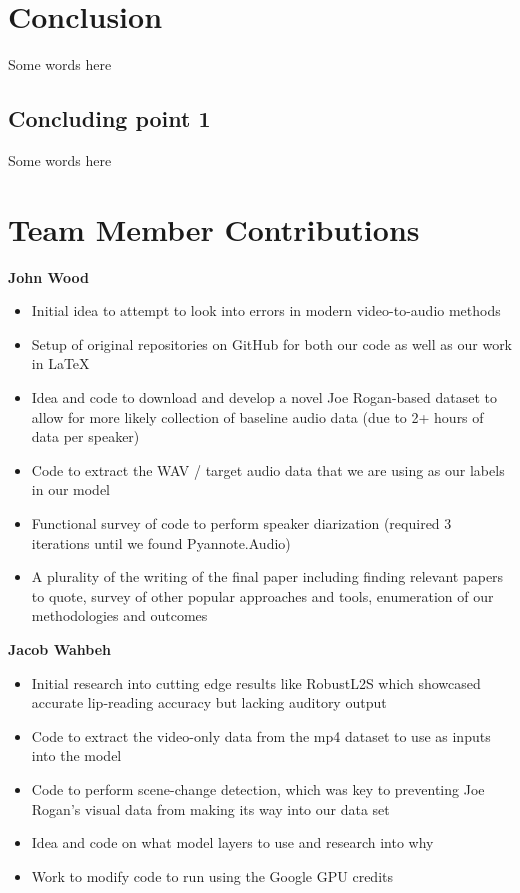 \documentclass[10pt,twocolumn,letterpaper]{article}
\begin{document}
\section{Conclusion}
\label{sec:conclusion}

Some words here

\subsection{Concluding point 1}

Some words here


\section{Team Member Contributions}
\label{sec:conclusion}
\textbf{{John Wood}}
\begin{itemize}
    \item Initial idea to attempt to look into errors in modern video-to-audio methods
    \item Setup of original repositories on GitHub for both our code as well as our work in \LaTeX 
    \item Idea and code to download and develop a novel Joe Rogan-based dataset to allow for more likely collection of baseline audio data (due to 2+ hours of data per speaker)
    \item Code to extract the WAV / target audio data that we are using as our labels in our model
    \item Functional survey of code to perform speaker diarization (required 3 iterations until we found Pyannote.Audio)
    \item A plurality of the writing of the final paper including finding relevant papers to quote,  survey of other popular approaches and tools, enumeration of our methodologies and outcomes
\end{itemize}


\textbf{{Jacob Wahbeh}}
\begin{itemize}
    \item Initial research into cutting edge results like RobustL2S which showcased accurate lip-reading accuracy but lacking auditory output
    \item Code to extract the video-only data from the mp4 dataset to use as inputs into the model
    \item Code to perform scene-change detection, which was key to preventing Joe Rogan's visual data from making its way into our data set
    \item Idea and code on what model layers to use and research into why
    \item Work to modify code to run using the Google GPU credits
\end{itemize}











{\small


}
\end{document}
